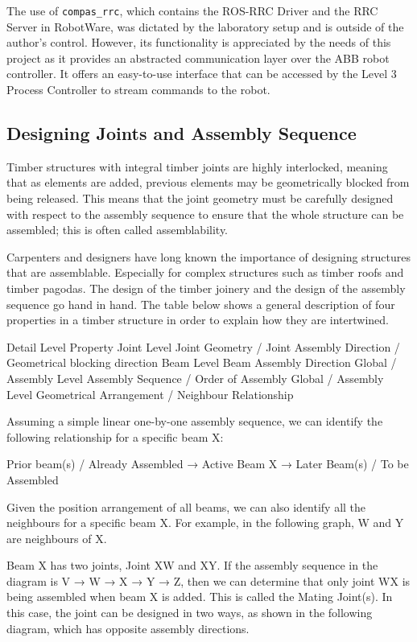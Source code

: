 The use of \verb|compas_rrc|, which contains the ROS-RRC Driver and the RRC Server in RobotWare, was dictated by the laboratory setup and is outside of the author’s control. However, its functionality is appreciated by the needs of this project as it provides an abstracted communication layer over the ABB robot controller. It offers an easy-to-use interface that can be accessed by the Level 3 Process Controller to stream commands to the robot.

\subsection{Designing Joints and Assembly Sequence}
\label{subsection:exploration_2_designing_joints_and_assembly_sequence}

Timber structures with integral timber joints are highly interlocked, meaning that as elements are added, previous elements may be geometrically blocked from being released. This means that the joint geometry must be carefully designed with respect to the assembly sequence to ensure that the whole structure can be assembled; this is often called assemblability. 

Carpenters and designers have long known the importance of designing structures that are assemblable. Especially for complex structures such as timber roofs and timber pagodas. The design of the timber joinery and the design of the assembly sequence go hand in hand. The table below shows a general description of four properties in a timber structure in order to explain how they are intertwined.

Detail Level
Property
Joint Level
Joint Geometry / Joint Assembly Direction / Geometrical blocking direction 
Beam Level
Beam Assembly Direction
Global / Assembly Level
Assembly Sequence / Order of Assembly
Global / Assembly Level
Geometrical Arrangement / Neighbour Relationship


Assuming a simple linear one-by-one assembly sequence, we can identify the following relationship for a specific beam X:

Prior beam(s) / Already Assembled → Active Beam X → Later Beam(s) / To be Assembled

Given the position arrangement of all beams, we can also identify all the neighbours for a specific beam X. For example, in the following graph, W and Y are neighbours of X.

Beam X has two joints, Joint XW and XY. If the assembly sequence in the diagram is V → W → X → Y → Z, then we can determine that only joint WX is being assembled when beam X is added. This is called the Mating Joint(s). In this case, the joint can be designed in two ways, as shown in the following diagram, which has opposite assembly directions.

